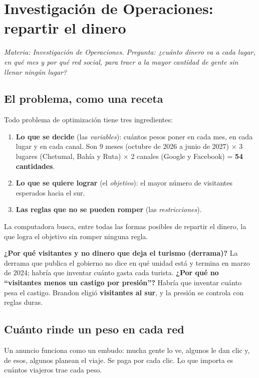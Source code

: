 \chapter{Investigación de Operaciones: repartir el dinero}
\label{cap:s-dinero}
\textit{Materia: Investigación de Operaciones. Pregunta: ¿cuánto dinero va a cada lugar, en qué mes y por qué red social,
para traer a la mayor cantidad de gente sin llenar ningún lugar?}

\section{El problema, como una receta}
Todo problema de optimización tiene tres ingredientes:
\begin{enumerate}
\item \textbf{Lo que se decide} (las \emph{variables}): cuántos pesos poner en cada mes, en cada lugar y en cada canal.
  Son 9 meses (octubre de 2026 a junio de 2027) $\times$ 3 lugares (Chetumal, Bahía y Ruta) $\times$ 2 canales (Google y
  Facebook) = \textbf{54 cantidades}.
\item \textbf{Lo que se quiere lograr} (el \emph{objetivo}): el mayor número de visitantes esperados hacia el sur.
\item \textbf{Las reglas que no se pueden romper} (las \emph{restricciones}).
\end{enumerate}
La computadora busca, entre todas las formas posibles de repartir el dinero, la que logra el objetivo sin romper ninguna
regla.

\begin{porque}
\textbf{¿Por qué visitantes y no dinero que deja el turismo (derrama)?} La derrama que publica el gobierno no dice en qué
unidad está y termina en marzo de 2024; habría que inventar cuánto gasta cada turista. \textbf{¿Por qué no ``visitantes
menos un castigo por presión''?} Habría que inventar cuánto pesa el castigo. Brandon eligió \textbf{visitantes al sur}, y la
presión se controla con reglas duras.
\end{porque}

\section{Cuánto rinde un peso en cada red}
\begin{intuicion}
Un anuncio funciona como un embudo: mucha gente lo ve, algunos le dan clic y, de esos, algunos planean el viaje. Se paga
por cada clic. Lo que importa es cuántos viajeros trae cada peso.
\end{intuicion}

